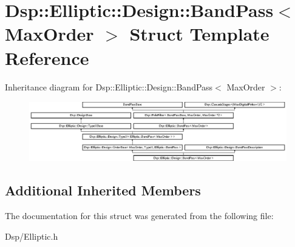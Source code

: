 \hypertarget{structDsp_1_1Elliptic_1_1Design_1_1BandPass}{\section{Dsp\-:\-:Elliptic\-:\-:Design\-:\-:Band\-Pass$<$ Max\-Order $>$ Struct Template Reference}
\label{structDsp_1_1Elliptic_1_1Design_1_1BandPass}
}
Inheritance diagram for Dsp\-:\-:Elliptic\-:\-:Design\-:\-:Band\-Pass$<$ Max\-Order $>$\-:\begin{figure}[H]
\begin{center}
\leavevmode
\includegraphics[height=2.598608cm]{structDsp_1_1Elliptic_1_1Design_1_1BandPass}
\end{center}
\end{figure}
\subsection*{Additional Inherited Members}


The documentation for this struct was generated from the following file\-:\begin{DoxyCompactItemize}
\item 
Dsp/Elliptic.\-h\end{DoxyCompactItemize}
